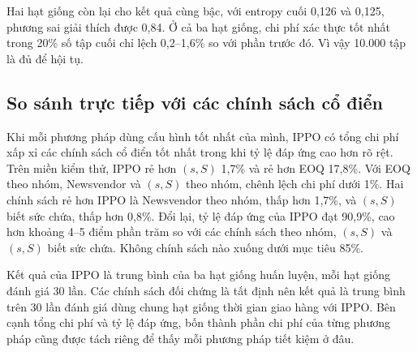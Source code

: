 Hai hạt giống còn lại cho kết quả cùng bậc, với entropy cuối 0,126 và 0,125, phương sai giải thích được 0,84. Ở cả ba hạt giống, chi phí xác thực tốt nhất trong 20\% số tập cuối chỉ lệch 0,2--1,6\% so với phần trước đó. Vì vậy 10.000 tập là đủ để hội tụ.

\subsection{So sánh trực tiếp với các chính sách cổ điển}
\label{subsec:soSanhChiPhi}

Khi mỗi phương pháp dùng cấu hình tốt nhất của mình, IPPO có tổng chi phí xấp xỉ các chính sách cổ điển tốt nhất trong khi tỷ lệ đáp ứng cao hơn rõ rệt. Trên miền kiểm thử, IPPO rẻ hơn $(s, S)$ 1,7\% và rẻ hơn EOQ 17,8\%. Với EOQ theo nhóm, Newsvendor và $(s, S)$ theo nhóm, chênh lệch chi phí dưới 1\%. Hai chính sách rẻ hơn IPPO là Newsvendor theo nhóm, thấp hơn 1,7\%, và $(s, S)$ biết sức chứa, thấp hơn 0,8\%. Đổi lại, tỷ lệ đáp ứng của IPPO đạt 90,9\%, cao hơn khoảng 4--5 điểm phần trăm so với các chính sách theo nhóm, $(s, S)$ và $(s, S)$ biết sức chứa. Không chính sách nào xuống dưới mục tiêu 85\%.

Kết quả của IPPO là trung bình của ba hạt giống huấn luyện, mỗi hạt giống đánh giá 30 lần. Các chính sách đối chứng là tất định nên kết quả là trung bình trên 30 lần đánh giá dùng chung hạt giống thời gian giao hàng với IPPO. Bên cạnh tổng chi phí và tỷ lệ đáp ứng, bốn thành phần chi phí của từng phương pháp cũng được tách riêng để thấy mỗi phương pháp tiết kiệm ở đâu.

